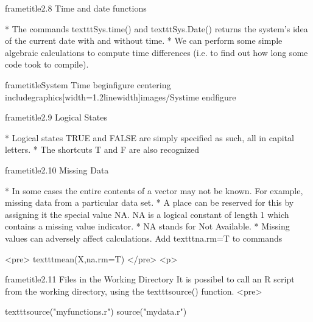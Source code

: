  	
 		frametitle{2.8 Time and date functions}
 		
 		         * The commands texttt{Sys.time()} and texttt{Sys.Date()} returns the system’s idea of the current date
 		with and without time. 
 		         * We can perform some simple algebraic calculations to compute time
 		differences (i.e. to find out how long some code took to compile).
 		
 		
 	
 	
 		frametitle{System Time}
 		begin{figure}
 			centering
 			includegraphics[width=1.2linewidth]{images/Systime}
 		end{figure}
 		
 	
 	 
 		frametitle{2.9 Logical States}
 		
 			         * Logical states TRUE and FALSE are simply specified as such, all in capital letters. 
 			         * The
 			shortcuts T and F are also recognized
 		
 	
 	
 		frametitle{2.10 Missing Data}
 		
 			         * In some cases the entire contents of a vector may not be known. For example, missing data
 			from a particular data set.          * A place can be reserved for this by assigning it the special value
 			NA.
 			NA is a logical constant of length 1 which contains a missing value indicator.
 			          * NA stands
 			for Not Available.
 			         * Missing values can adversely affect calculations. Add texttt{na.rm=T} to commands
 			
 			<pre>
 			texttt{mean(X,na.rm=T)}
 			</pre>
<p>
 		
 	
 	
 		
 		frametitle{2.11 Files in the Working Directory}
 		It is possibel to call an R script from the working directory, using the texttt{source()} function.
 		<pre>
 			
 			texttt{source("myfunctions.r")
 				source("mydata.r")}
 			
